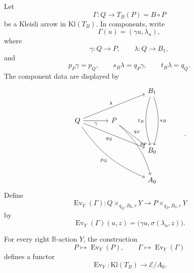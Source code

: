 \begin{definition}
\label{def:relative-kleisli-comparison-evaluation}
Let
\[
\Gamma:Q\to T_B(P)=B\circ P
\]
be a Kleisli arrow in \(\mathrm{Kl}(T_B)\). In components, write
\[
\Gamma(u)=(\gamma u,\lambda_u),
\]
where
\[
\gamma:Q\to P,
\qquad
\lambda:Q\to B_1,
\]
and
\[
p_P\gamma=p_Q,
\qquad
s_B\lambda=q_P\gamma,
\qquad
t_B\lambda=q_Q.
\]
The component data are displayed by
\[
\begin{tikzcd}[column sep=large,row sep=large]
&& B_1
  \arrow[dd,bend left=18,"s_B"]
  \arrow[dd,bend right=18,"t_B"']
&
\\
Q
  \arrow[rru,"\lambda"]
  \arrow[r,"\gamma"']
  \arrow[drr,"q_Q"']
  \arrow[ddrr,bend right=16,"p_Q"']
&
P
  \arrow[dr,"q_P"]
  \arrow[rdd,bend left=16,"p_P"]
&&
\\
&& B_0 &
\\
&& A_0 &
\end{tikzcd}
.
\]
Define
\[
\operatorname{Ev}_Y(\Gamma):
Q\times_{q_Q,B_0,r}Y
\longrightarrow
P\times_{q_P,B_0,r}Y
\]
by
\[
\operatorname{Ev}_Y(\Gamma)(u,z)
=
\bigl(\gamma u,\sigma(\lambda_u,z)\bigr).
\]
\end{definition}

\begin{proposition}
\label{prop:relative-evaluation-functorial}
For every right \(\mathbb B\)-action \(Y\), the construction
\[
P\longmapsto \operatorname{Ev}_Y(P),
\qquad
\Gamma\longmapsto \operatorname{Ev}_Y(\Gamma)
\]
defines a functor
\[
\operatorname{Ev}_Y:\mathrm{Kl}(T_B)\to \mathcal E/A_0.
\]
\end{proposition}

